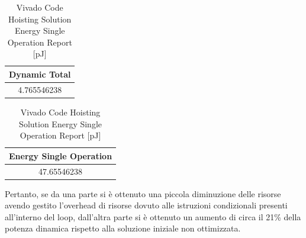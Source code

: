 \begin{table}[H]
    \centering
    \begin{minipage}[t]{0.45\linewidth}
        \centering
        \begin{tabular}{|c|}
            \hline
            \textbf{Dynamic Total} \\
            \hline
            4.765546238 \\
            \hline
        \end{tabular}
        \caption{Vivado Code Hoisting Solution Dynamic Power Report [mW]}
        \label{tab:vivado-code-hoisting-solution-dynamic-power-reproot}
    \end{minipage}
    \hfill
    \centering
    \begin{minipage}[t]{0.45\linewidth}
        \centering
        \begin{tabular}{|c|}
            \hline
            \textbf{Energy Single Operation} \\
            \hline
            47.65546238 \\
            \hline
        \end{tabular}
        \caption{Vivado Code Hoisting Solution Energy Single Operation Report [pJ]}
        \label{tab:vivado-code-hoisting-solution-energy-single-operation-reproot}
    \end{minipage}
\end{table}

Pertanto, se da una parte si è ottenuto una piccola diminuzione delle risorse avendo gestito l'overhead di risorse dovuto alle istruzioni condizionali presenti all'interno del loop, dall'altra parte si è ottenuto un aumento di circa il 21\% della potenza dinamica rispetto alla soluzione iniziale non ottimizzata.